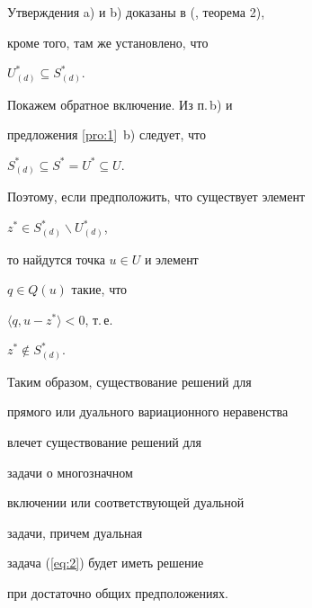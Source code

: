 \begin{pf}


Утверждения a) и b) доказаны в (\cite{Kon96}, теорема 2),


кроме того, там же установлено, что


$U^{*}_{(d)} \subseteq S^{*}_{(d)}$.


Покажем обратное включение. Из п.\,b) и


предложения \ref{pro:1}~b) следует, что


$S^{*}_{(d)} \subseteq S^{*} = U^{*} \subseteq U$.


Поэтому, если предположить, что существует элемент


$z^{*} \in S^{*}_{(d)} \backslash U^{*}_{(d)}$,


то найдутся точка $ u\in U $ и элемент


$q\in Q(u)$ такие, что


$ \langle q, u-z^{*} \rangle < 0$, т.\,е.{}


$z^{*} \notin S^{*}_{(d)}$.


\end{pf}





Таким образом, существование решений для


прямого или дуального вариационного неравенства


влечет существование решений для


задачи о многозначном


включении или соответствующей дуальной


задачи, причем дуальная


задача (\ref{eq:2}) будет иметь решение


при достаточно общих предположениях.















